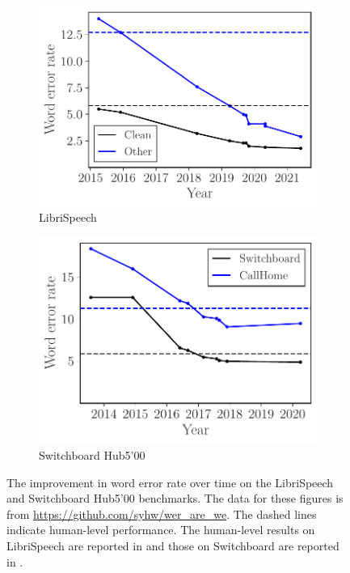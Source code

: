 \begin{figure}[ht!]
    \centering
    \begin{subfigure}[b]{0.48\textwidth}
    \centering
    \includegraphics[width=\linewidth]{figures/librispeech_wer}
    \caption{LibriSpeech}
    \end{subfigure}
    \hfill
    \begin{subfigure}[b]{0.48\textwidth}
    \centering
    \includegraphics[width=\linewidth]{figures/switchboard_wer}
    \caption{Switchboard Hub5'00}
    \end{subfigure}
    \caption{The improvement in word error rate over time on the
    LibriSpeech~\citep{panayotov2015librispeech} and Switchboard Hub5'00
    benchmarks. The data for these figures is from
    \url{https://github.com/syhw/wer_are_we}. The dashed lines indicate
    human-level performance. The human-level results on LibriSpeech are
    reported in \citet{amodei2016deep} and those on Switchboard are reported in
    \citet{xiong2016achieving}.}
    \label{fig:wers}
\end{figure}

